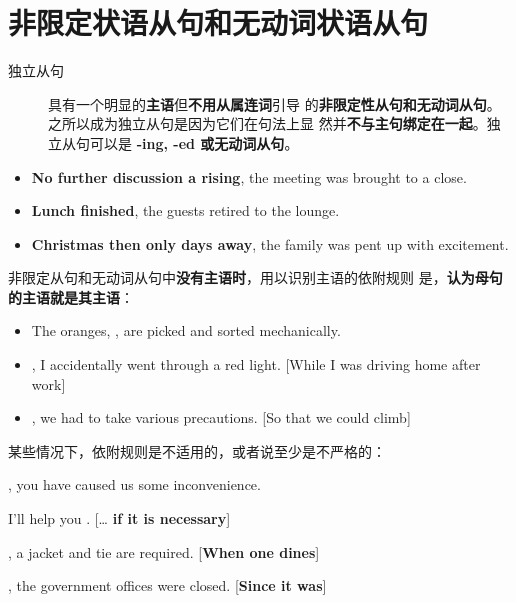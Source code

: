 \section{非限定状语从句和无动词状语从句}

\begin{description}
\item[独立从句] 具有一个明显的\textbf{主语}但\textbf{不用从属连词}引导
  的\textbf{非限定性从句和无动词从句}。之所以成为独立从句是因为它们在句法上显
  然并\textbf{不与主句绑定在一起}。独立从句可以是\textbf{ -ing, -ed 或无动词从句}。
\end{description}

\begin{itemize}
\item \textbf{No further discussion a rising}, the meeting was brought to a close.
\item \textbf{Lunch finished}, the guests retired to the lounge.
\item \textbf{Christmas then only days away}, the family was pent up with excitement.
\end{itemize}

非限定从句和无动词从句中\textbf{没有主语时}，用以识别主语的依附规则
是，\textbf{认为母句的主语就是其主语}：
\begin{itemize}
\item The oranges, , are picked and sorted
  mechanically.

\item {}, I accidentally went through a red
  light. [While I was driving home after work]

\item {}, we had to take various precautions. [So that
  we could climb]

\end{itemize}

某些情况下，依附规则是不适用的，或者说至少是不严格的：
\begin{description}[style=nextline]
\item[从句是一个主语外接状语, 这时隐含的主语是说话者 I]

  , you have caused us some inconvenience.

\item[隐含的主语是整个主句]

  I'll help you . [\ldots{} \textbf{if it is necessary}]

\item[隐含的主语是一个不定代词或支撑词 it]

  , a jacket and tie are required. [\textbf{When one
  dines}]

  , the government offices were closed. [\textbf{Since it was}]
\end{description}

